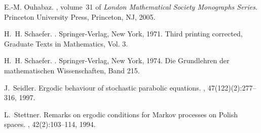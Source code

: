 \documentclass{amsart}
\numberwithin{equation}{section}
\theoremstyle{remark}
\theoremstyle{definition}
\begin{document}
\begin{thebibliography}{10}
E.-M. Ouhabaz.
, volume~31 of {\em London
  Mathematical Society Monographs Series}.
\newblock Princeton University Press, Princeton, NJ, 2005.

H.~H. Schaefer.
.
\newblock Springer-Verlag, New York, 1971.
\newblock Third printing corrected, Graduate Texts in Mathematics, Vol. 3.

H.~H. Schaefer.
.
\newblock Springer-Verlag, New York, 1974.
\newblock Die Grundlehren der mathematischen Wissenschaften, Band 215.

J.~Seidler.
\newblock Ergodic behaviour of stochastic parabolic equations.
, 47(122)(2):277--316, 1997.

L.~Stettner.
\newblock Remarks on ergodic conditions for {M}arkov processes on {P}olish
  spaces.
, 42(2):103--114, 1994.
\end{thebibliography}
\end{document}
